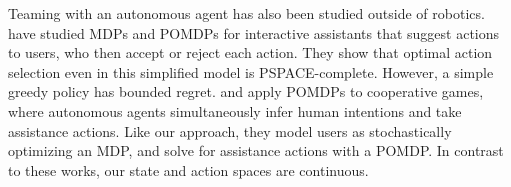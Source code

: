 Teaming with an autonomous agent has also been studied outside of robotics. \citet{fern_2010} have studied MDPs and POMDPs for interactive assistants that suggest actions to users, who then accept or reject each action. They show that optimal action selection even in this simplified model is PSPACE-complete. However, a simple greedy policy has bounded regret. \citet{nguyen_2011} and \citet{macindoe_2012} apply POMDPs to cooperative games, where autonomous agents simultaneously infer human intentions and take assistance actions. Like our approach, they model users as stochastically optimizing an MDP, and solve for assistance actions with a POMDP. In contrast to these works, our state and action spaces are continuous.

